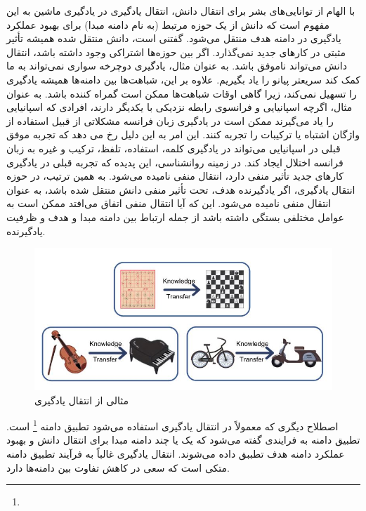 {	 با الهام از توانایی‌های بشر برای انتقال دانش، انتقال یادگیری در یادگیری ماشین به این مفهوم است که دانش از یک حوزه مرتبط (به نام دامنه مبدا) برای بهبود عملکرد یادگیری در دامنه هدف منتقل می‌شود. گفتنی است، دانش منتقل شده همیشه تأثیر مثبتی در کارهای جدید نمی‌گذارد. اگر بین حوزه‌ها اشتراکی وجود داشته باشد، انتقال دانش می‌تواند ناموفق باشد. به عنوان مثال، یادگیری دوچرخه سواری نمی‌تواند به ما کمک کند سریعتر پیانو را یاد بگیریم. علاوه بر این، شباهت‌ها بین دامنه‌ها همیشه یادگیری را تسهیل نمی‌کند، زیرا گاهی اوقات شباهت‌ها ممکن است گمراه کننده باشد. به عنوان مثال‌، اگرچه اسپانیایی و فرانسوی رابطه نزدیکی با یکدیگر دارند، افرادی که اسپانیایی را یاد می‌گیرند ممکن است در یادگیری زبان فرانسه مشکلاتی از قبیل استفاده از واژگان اشتباه یا ترکیبات را تجربه کنند. این امر به این دلیل رخ می دهد که تجربه موفق قبلی در اسپانیایی می‌تواند در یادگیری کلمه، استفاده، تلفظ، ترکیب و غیره به زبان فرانسه اختلال ایجاد کند. در زمینه روانشناسی، این پدیده که تجربه قبلی در یادگیری کارهای جدید تأثیر منفی دارد، انتقال منفی نامیده می‌شود. به همین ترتیب، در حوزه انتقال یادگیری، اگر یادگیرنده هدف، تحت تأثیر منفی دانش منتقل شده باشد، به عنوان انتقال منفی نامیده می‌شود. این که آیا انتقال منفی اتفاق می‌افتد ممکن است به عوامل مختلفی بستگی داشته باشد از جمله ارتباط بین دامنه مبدا و هدف و ظرفیت یادگیرنده.
	\cite{zhuang2020comprehensive}
	\begin{figure}
		\centering
		\includegraphics[scale=0.4]{images/example.jpg}
		\caption{مثالی از انتقال یادگیری \cite{zhuang2020comprehensive}}
		\label{fig:9}
	\end{figure}

	اصطلاح دیگری که معمولاً در انتقال یادگیری استفاده می‌شود تطبیق دامنه
	 \footnote{}
	 است. تطبیق دامنه به فرایندی گفته می‌شود که یک یا چند دامنه مبدا برای انتقال دانش و بهبود عملکرد دامنه هدف تطببق داده می‌شوند. انتقال یادگیری غالباً به فرآیند تطبیق دامنه متکی است که سعی در کاهش تفاوت بین دامنه‌ها دارد.
	 \cite{weiss2016survey}
	
}